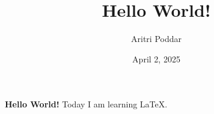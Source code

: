 \documentclass{article}
\title{Hello World!}
\author{Aritri Poddar}
\date{April 2, 2025}
\begin{document}
 
\maketitle 
\textbf{Hello World!} Today I am learning \LaTeX. 
\end{document}
